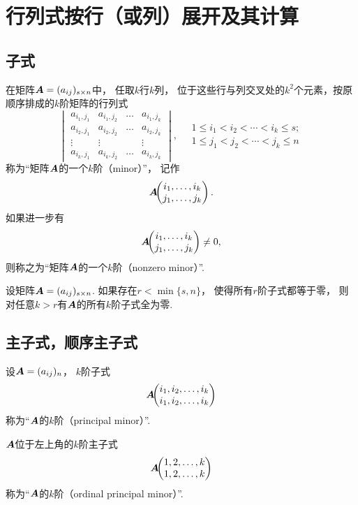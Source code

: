 \section{行列式按行（或列）展开及其计算}
\subsection{子式}
\begin{definition}
在矩阵\(\boldsymbol{A}=(a_{ij})_{s \times n}\)中，
任取\(k\)行\(k\)列，
位于这些行与列交叉处的\(k^2\)个元素，按原顺序排成的\(k\)阶矩阵的行列式\[
	\begin{vmatrix}
		a_{i_1,j_1} & a_{i_1,j_2} & \dots & a_{i_1,j_k} \\
		a_{i_2,j_1} & a_{i_2,j_2} & \dots & a_{i_2,j_k} \\
		\vdots & \vdots & & \vdots \\
		a_{i_k,j_1} & a_{i_k,j_2} & \dots & a_{i_k,j_k}
	\end{vmatrix},
	\quad
	\begin{array}{c}
		1 \leq i_1 < i_2 < \dotsb < i_k \leq s; \\
		1 \leq j_1 < j_2 < \dotsb < j_k \leq n
	\end{array}
\]称为“矩阵\(\boldsymbol{A}\)的一个\(k\)阶（minor）”，
记作\[
	\MatrixMinor{\vb{A}}{
		\AutoTuple{i}{k} \\
		\AutoTuple{j}{k}
	}.
\]
如果进一步有\[
	\MatrixMinor{\vb{A}}{
		\AutoTuple{i}{k} \\
		\AutoTuple{j}{k}
	}
	\neq 0,
\]
则称之为“矩阵\(\boldsymbol{A}\)的一个\(k\)阶（nonzero minor）”.
\end{definition}

\begin{property}
设矩阵\(\boldsymbol{A} = (a_{ij})_{s \times n}\).
如果存在\(r < \min\{s,n\}\)，
使得所有\(r\)阶子式都等于零，
则对任意\(k > r\)有\(\boldsymbol{A}\)的所有\(k\)阶子式全为零.
\end{property}

\subsection{主子式，顺序主子式}
\begin{definition}
设\(\boldsymbol{A}=(a_{ij})_n\)，
\(k\)阶子式\[
	\boldsymbol{A}\kern-3.8pt\begin{pmatrix}
		i_1,i_2,\dotsc,i_k \\
		i_1,i_2,\dotsc,i_k
	\end{pmatrix}
\]
称为“\(\boldsymbol{A}\)的\(k\)阶（principal minor）”.

\(\boldsymbol{A}\)位于左上角的\(k\)阶主子式\[
	\boldsymbol{A}\kern-3.8pt\begin{pmatrix}
		1,2,\dotsc,k \\
		1,2,\dotsc,k
	\end{pmatrix}
\]称为“\(\boldsymbol{A}\)的\(k\)阶（ordinal principal minor）”.
\end{definition}

